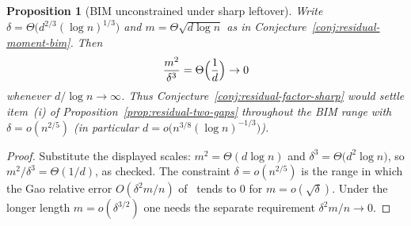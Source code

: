 \documentclass[11pt]{article}
\newtheorem{proposition}[theorem]{Proposition}
\begin{document}
\begin{proposition}[BIM unconstrained under sharp leftover]
\label{prop:residual-sharp-bim}
Write \(\delta=\Theta\bigl(d^{2/3}(\log n)^{1/3}\bigr)\) and
\(m=\Theta\sqrt{d\log n}\) as in Conjecture~\ref{conj:residual-moment-bim}.
Then
\[
\frac{m^2}{\delta^3}
=
\Theta\Bigl(\frac1d\Bigr)\to0
\]
whenever \(d/\log n\to\infty\). Thus Conjecture~\ref{conj:residual-factor-sharp}
would settle item~(i) of Proposition~\ref{prop:residual-two-gaps} throughout the
BIM range with \(\delta=o(n^{2/5})\) (in particular
\(d=o\bigl(n^{3/8}(\log n)^{-1/3}\bigr)\)).
\end{proposition}

\begin{proof}
Substitute the displayed scales:
\(m^2=\Theta(d\log n)\) and
\(\delta^3=\Theta\bigl(d^2\log n\bigr)\), so
\(m^2/\delta^3=\Theta(1/d)\), as checked. The constraint \(\delta=o(n^{2/5})\) is the range in which the Gao relative
error \(O(\delta^2 m/n)\) of~\cite[Theorem~6]{Gao20} tends to \(0\) for
\(m=o(\sqrt\delta)\). Under the longer length \(m=o(\delta^{3/2})\) one needs
the separate requirement \(\delta^2 m/n\to0\).
\end{proof}
\end{document}
